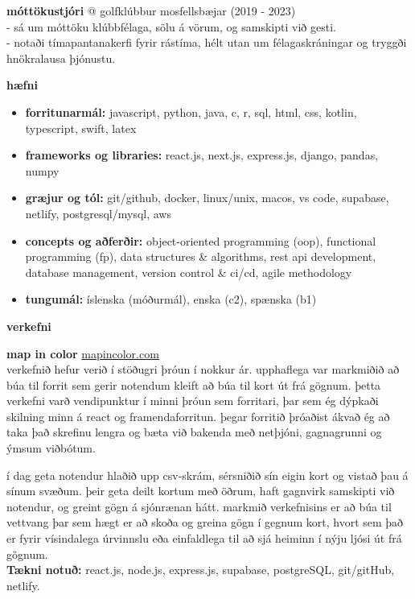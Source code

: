 \documentclass[11pt]{article}
\newcommand{\cvsection}[1]{\vspace{2em}\textbf{\large #1}\par\vspace{1em}}
\begin{document}
\textbf{móttökustjóri} @ golfklúbbur mosfellsbæjar \hfill (2019 - 2023)\\
- sá um móttöku klúbbfélaga, sölu á vörum, og samskipti við gesti. \\
- notaði tímapantanakerfi fyrir rástíma, hélt utan um félagaskráningar og tryggði hnökralausa þjónustu.

\cvsection{hæfni}
\begin{itemize}
  \item \textbf{forritunarmál:} javascript, python, java, c, r, sql, html, css, kotlin, typescript, swift, latex
  \item \textbf{frameworks og libraries:} react.js, next.js, express.js, django, pandas, numpy
  \item \textbf{græjur og tól:} git/github, docker, linux/unix, macos, vs code, supabase, netlify, postgresql/mysql, aws
  \item \textbf{concepts og aðferðir:} object-oriented programming (oop), functional programming (fp), data structures \& algorithms, rest api development, database management, version control \& ci/cd, agile methodology
  \item \textbf{tungumál:} íslenska (móðurmál), enska (c2), spænska (b1)
\end{itemize}

\newpage

\cvsection{verkefni}
\textbf{map in color} \hfill \href{https://mapincolor.com}{mapincolor.com}\\
verkefnið hefur verið í stöðugri þróun í nokkur ár. upphaflega var markmiðið að búa til forrit sem gerir notendum kleift að búa til kort út frá gögnum. þetta verkefni varð vendipunktur í minni þróun sem forritari, þar sem ég dýpkaði skilning minn á react og framendaforritun. þegar forritið þróaðist ákvað ég að taka það skrefinu lengra og bæta við bakenda með netþjóni, gagnagrunni og ýmsum viðbótum.

í dag geta notendur hlaðið upp csv-skrám, sérsniðið sín eigin kort og vistað þau á sínum svæðum. þeir geta deilt kortum með öðrum, haft gagnvirk samskipti við notendur, og greint gögn á sjónrænan hátt. markmið verkefnisins er að búa til vettvang þar sem hægt er að skoða og greina gögn í gegnum kort, hvort sem það er fyrir vísindalega úrvinnslu eða einfaldlega til að sjá heiminn í nýju ljósi út frá gögnum.\\
\textbf{Tækni notuð:} react.js, node.js, express.js, supabase, postgreSQL, git/gitHub, netlify.
\end{document}
